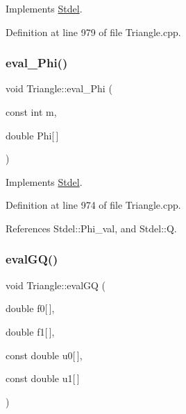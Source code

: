 Implements \hyperlink{classStdel_a83a7a53e4be6da7c3a615967e4504b07}{Stdel}.



Definition at line 979 of file Triangle.\+cpp.

\mbox{\label{classTriangle_a871ac2a2f38f1c9f8f36a6cc4bd1eef5}} 
\subsubsection{\texorpdfstring{eval\+\_\+\+Phi()}{eval\_Phi()}}
{\footnotesize\ttfamily void Triangle\+::eval\+\_\+\+Phi (\begin{DoxyParamCaption}\item[{const int}]{m,  }\item[{double}]{Phi\mbox{[}$\,$\mbox{]} }\end{DoxyParamCaption})\hspace{0.3cm}{\ttfamily [virtual]}}



Implements \hyperlink{classStdel_a2aa6ea12ceaa1fa4a7f63909ce41bc0b}{Stdel}.



Definition at line 974 of file Triangle.\+cpp.



References Stdel\+::\+Phi\+\_\+val, and Stdel\+::Q.

\mbox{\label{classTriangle_acb912416d2fe57c6c4a501fdc123e6d3}} 
\subsubsection{\texorpdfstring{eval\+G\+Q()}{evalGQ()}\hspace{0.1cm}{\footnotesize\ttfamily [1/2]}}
{\footnotesize\ttfamily void Triangle\+::eval\+GQ (\begin{DoxyParamCaption}\item[{double}]{f0\mbox{[}$\,$\mbox{]},  }\item[{double}]{f1\mbox{[}$\,$\mbox{]},  }\item[{const double}]{u0\mbox{[}$\,$\mbox{]},  }\item[{const double}]{u1\mbox{[}$\,$\mbox{]} }\end{DoxyParamCaption})\hspace{0.3cm}{\ttfamily [virtual]}}



